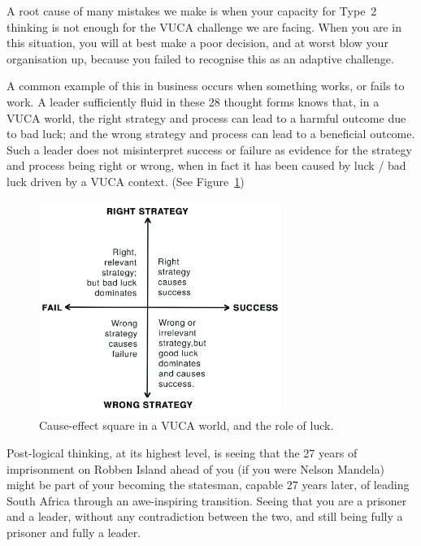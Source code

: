 A root cause of many mistakes we make is when your capacity for Type~2 thinking is not enough for the VUCA challenge we are facing. When you are in this situation, you will at best make a poor decision, and at worst blow your organisation up, because you failed to recognise this as an adaptive challenge.


A common example of this in business occurs when something works, or fails to work. A leader sufficiently fluid in these 28 thought forms knows that, in a VUCA  world, the right strategy and process can lead to a harmful outcome due to bad luck; and the wrong strategy and process can lead to a beneficial outcome. Such a leader does not misinterpret success or failure as evidence for the strategy and process being right or wrong, when in fact it has been caused by luck / bad luck driven by a VUCA context\cite{ormerod-why-fail, edmondson-fearless}. (See Figure~\ref{figure:vuca-luck})


\begin{figure}
\begin{center}\includegraphics[width=0.70\textwidth]{./Images/Vuca-Cause-and-Effect}\end{center}
\caption{Cause-effect square in a VUCA world, and the role of luck.}
\label{figure:vuca-luck}
\end{figure}


Post-logical thinking, at its highest level, is seeing that the 27 years of imprisonment on Robben Island ahead of you (if you were Nelson Mandela)  might be part of your becoming the statesman, capable 27 years later, of leading South Africa through an awe-inspiring transition. Seeing that you are a prisoner and a leader, without any contradiction between the two, and still being fully a prisoner and fully a leader.


